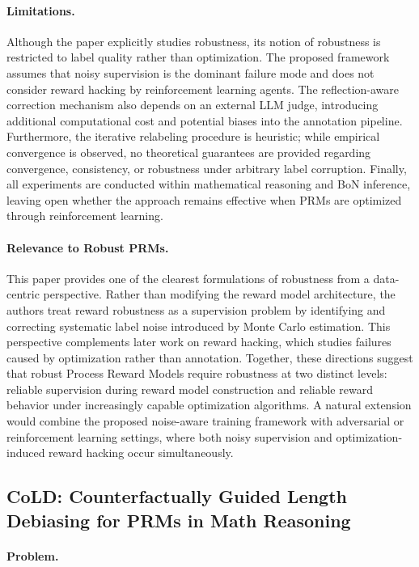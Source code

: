 \documentclass[11pt]{article}
\begin{document}
\paragraph{Limitations.}
Although the paper explicitly studies robustness, its notion of robustness is restricted to label quality rather than optimization. The proposed framework assumes that noisy supervision is the dominant failure mode and does not consider reward hacking by reinforcement learning agents. The reflection-aware correction mechanism also depends on an external LLM judge, introducing additional computational cost and potential biases into the annotation pipeline. Furthermore, the iterative relabeling procedure is heuristic; while empirical convergence is observed, no theoretical guarantees are provided regarding convergence, consistency, or robustness under arbitrary label corruption. Finally, all experiments are conducted within mathematical reasoning and BoN inference, leaving open whether the approach remains effective when PRMs are optimized through reinforcement learning.

\paragraph{Relevance to Robust PRMs.}
This paper provides one of the clearest formulations of robustness from a data-centric perspective. Rather than modifying the reward model architecture, the authors treat reward robustness as a supervision problem by identifying and correcting systematic label noise introduced by Monte Carlo estimation. This perspective complements later work on reward hacking, which studies failures caused by optimization rather than annotation. Together, these directions suggest that robust Process Reward Models require robustness at two distinct levels: reliable supervision during reward model construction and reliable reward behavior under increasingly capable optimization algorithms. A natural extension would combine the proposed noise-aware training framework with adversarial or reinforcement learning settings, where both noisy supervision and optimization-induced reward hacking occur simultaneously.

\subsection{CoLD: Counterfactually Guided Length Debiasing for PRMs in Math Reasoning} 

\paragraph{Problem.}
\end{document}
